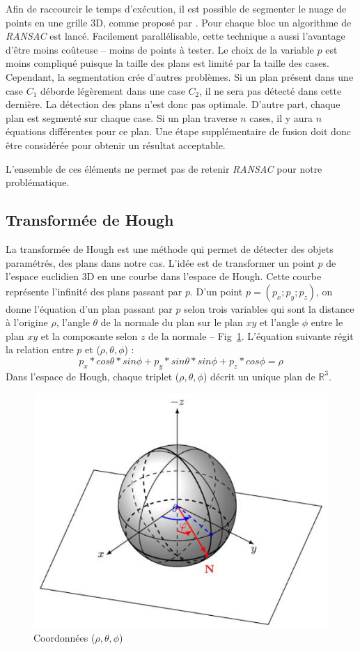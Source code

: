 ﻿\documentclass[12pt, twoside]{article}
\begin{document}
Afin de raccourcir le temps d'exécution, il est possible de segmenter le nuage de points en une grille 3D, comme proposé par \cite{RANSAC2}. Pour chaque bloc un algorithme de \textit{RANSAC} est lancé. Facilement parallélisable, cette technique a aussi l'avantage d'être moins coûteuse -- moins de points à tester. Le choix de la variable $p$ est moins compliqué puisque la taille des plans est limité par la taille des cases. Cependant, la segmentation crée d'autres problèmes. Si un plan présent dans une case $C_1$ déborde légèrement dans une case $C_2$, il ne sera pas détecté dans cette dernière. La détection des plans n'est donc pas optimale. D'autre part, chaque plan est segmenté sur chaque case. Si un plan traverse $n$ cases, il y aura $n$ équations différentes pour ce plan. Une étape supplémentaire de fusion doit donc être considérée pour obtenir un résultat acceptable.

L'ensemble de ces éléments ne permet pas de retenir \textit{RANSAC} pour notre problématique.

\subsection{Transformée de Hough}
La transformée de Hough est une méthode qui permet de détecter des objets paramétrés, des plans dans notre cas. L’idée est de transformer un point $p$ de l’espace euclidien 3D en une courbe dans l’espace de Hough. Cette courbe représente l’infinité des plans passant par $p$. D’un point $p = (p_x; p_y; p_z)$, on donne l’équation d’un plan passant par $p$ selon trois variables qui sont la distance à l’origine $\rho$, l’angle $\theta$ de la normale du plan sur le plan $xy$ et l’angle $\phi$ entre le plan $xy$ et la composante selon $z$ de la normale -- Fig~\ref{fig:Hough1}. L’équation suivante régit la relation entre $p$ et ($\rho, \theta, \phi$) :
$$p_x*cos\theta * sin\phi + p_y*sin\theta*sin\phi + p_z*cos\phi = \rho$$
Dans l'espace de Hough, chaque triplet ($\rho, \theta, \phi$) décrit un unique plan de $\mathbb{R}^3$.

\begin{figure}[h]
\centering
\includegraphics[scale=0.5]{HoughCoord.png}
\caption{\label{fig:Hough1} Coordonnées ($\rho, \theta, \phi$)}
\end{figure}
\end{document}

